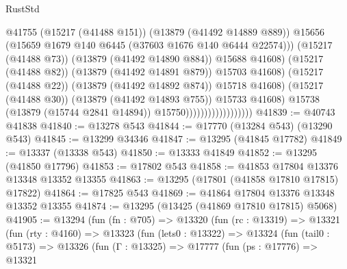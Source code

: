 \begin{lexlean}{RustStd}
\begin{coremodule}
                                                  @41755
                                                  (@15217 (@41488 @151))
                                                  (@13879 (@41492 @14889 @889))
                                                  @15656
                                                  (@15659
                                                    @1679
                                                    @140
                                                    @6445
                                                    (@37603 @1676 @140 @6444 @22574)))
                                                (@15217 (@41488 @73))
                                                (@13879 (@41492 @14890 @884))
                                                @15688
                                                @41608)
                                              (@15217 (@41488 @82))
                                              (@13879 (@41492 @14891 @879))
                                              @15703
                                              @41608)
                                            (@15217 (@41488 @22))
                                            (@13879 (@41492 @14892 @874))
                                            @15718
                                            @41608)
                                          (@15217 (@41488 @30))
                                          (@13879 (@41492 @14893 @755))
                                          @15733
                                          @41608)
                                        @15738
                                        (@13879 (@15744 @2841 @14894))
                                        @15750))))))))))))))))))
@41839 := @40743 @41838
@41840 := @13278 @543
@41844 := @17770 (@13284 @543) (@13290 @543)
@41845 := @13299 @34346
@41847 := @13295 (@41845 @17782)
@41849 := @13337 (@13338 @543)
@41850 := @13333 @41849
@41852 := @13295 (@41850 @17796)
@41853 := @17802 @543
@41858 := @41853 @17804 @13376 @13348 @13352 @13355
@41863 := @13295 (@17801 (@41858 @17810 @17815) @17822)
@41864 := @17825 @543
@41869 := @41864 @17804 @13376 @13348 @13352 @13355
@41874 := @13295 (@13425 (@41869 @17810 @17815) @5068)
@41905 := @13294
    (fun (fn : @705) =>
    @13320
      (fun (rc : @13319) =>
      @13321
        (fun (rty : @4160) =>
        @13323
          (fun (lets0 : @13322) =>
          @13324
            (fun (tail0 : @5173) =>
            @13326
              (fun (Γ : @13325) =>
              @17777
                (fun (ps : @17776) =>
                @13321

\end{coremodule}
\end{lexlean}
